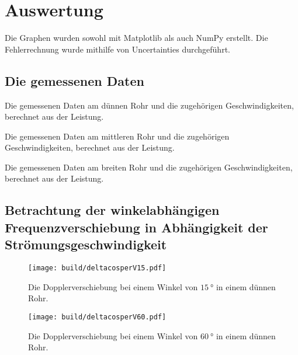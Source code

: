 \section{Auswertung}
\label{sec:Auswertung}


Die Graphen wurden sowohl mit Matplotlib \cite{matplotlib} als auch NumPy \cite{numpy} erstellt. Die
Fehlerrechnung wurde mithilfe von Uncertainties \cite{uncertainties} durchgeführt.

\subsection{Die gemessenen Daten}

\begin{table}
 \centering
 \caption{Die gemessenen Daten am dünnen Rohr und die zugehörigen Geschwindigkeiten, berechnet aus der Leistung.}
 
 \label{tab:k}
\end{table}

\begin{table}
 \centering
 \caption{Die gemessenen Daten am mittleren Rohr und die zugehörigen Geschwindigkeiten, berechnet aus der Leistung.}
 
 \label{tab:m}
\end{table}

\begin{table}
 \centering
 \caption{Die gemessenen Daten am breiten Rohr und die zugehörigen Geschwindigkeiten, berechnet aus der Leistung.}
 
 \label{tab:b}
\end{table}

\subsection{Betrachtung der winkelabhängigen Frequenzverschiebung in Abhängigkeit der Strömungsgeschwindigkeit}


\begin{figure}
 \centering
 \caption{Die Dopplerverschiebung bei einem Winkel von $\SI{15}{\degree}$ in einem dünnen Rohr.}
 \texttt{[image: build/deltacosperV15.pdf]}
 \label{fig:k15}
\end{figure}

\begin{figure}
 \centering
 \caption{Die Dopplerverschiebung bei einem Winkel von $\SI{60}{\degree}$ in einem dünnen Rohr.}
 \texttt{[image: build/deltacosperV60.pdf]}
 \label{fig:k60}
\end{figure}

